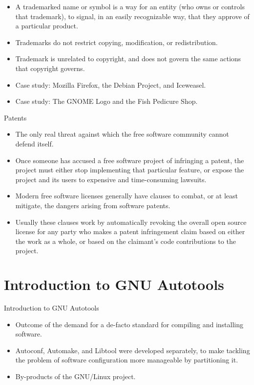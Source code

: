 \documentclass{beamer}
\begin{document}
\begin{frame}
\begin{itemize}
	\item A trademarked name or symbol is a way for an entity (who owns or controls that trademark), to signal, in an easily recognizable way, that they approve of a particular product. 
	\item Trademarks do not restrict copying, modification, or redistribution. 
	\item Trademark is unrelated to copyright, and does not govern the same actions that copyright governs.
	\item Case study: Mozilla Firefox, the Debian Project, and Iceweasel.
	\item Case study: The GNOME Logo and the Fish Pedicure Shop.
\end{itemize}
\end{frame}

\begin{frame}{Patents}
\begin{itemize}
	\item The only real threat against which the free software community cannot defend itself. 
	\item Once someone has accused a free software project of infringing a patent, the project must either stop implementing that particular feature, or expose the project and its users to expensive and time-consuming lawsuits. 
	\item Modern free software licenses generally have clauses to combat, or at least mitigate, the dangers arising from software patents.
	\item Usually these clauses work by automatically revoking the overall open source license for any party who makes a patent infringement claim based on either the work as a whole, or based on the claimant's code contributions to the project. 
\end{itemize}
\end{frame}

\section{Introduction to GNU Autotools}
\begin{frame}{Introduction to GNU Autotools}\pause
\begin{itemize}
	\item Outcome of the demand for a de-facto standard for compiling and installing software.\pause
	\item Autoconf, Automake, and Libtool were developed separately, to make tackling the problem of software configuration more manageable by partitioning it. \pause
	\item By-products of the GNU/Linux project.
	\end{itemize}
\end{frame}
\end{document}
